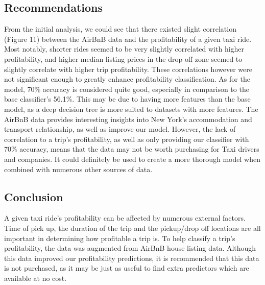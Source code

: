 \documentclass[11pt]{article}
\begin{document}
\subsection{Recommendations}
From the initial analysis, we could see that there existed slight correlation (Figure 11) between the AirBnB data and the profitability of a given taxi ride. Most notably, shorter rides seemed to be very slightly correlated with higher profitability, and higher median listing prices in the drop off zone seemed to slightly correlate with higher trip profitability. These correlations however were not significant enough to greatly enhance profitability classification. As for the model, 70\% accuracy is considered quite good, especially in comparison to the base classifier's 56.1\%. This may be due to having more features than the base model, as a deep decision tree is more suited to datasets with more features. The AirBnB data provides interesting insights into New York's accommodation and transport relationship, as well as improve our model. However, the lack of correlation to a trip's profitability, as well as only providing our classifier with 70\% accuracy, means that the data may not be worth purchasing for Taxi drivers and companies. It could definitely be used to create a more thorough model when combined with numerous other sources of data.

\subsection{Conclusion}
A given taxi ride's profitability can be affected by numerous external factors. Time of pick up, the duration of the trip and the pickup/drop off locations are all important in determining how profitable a trip is. To help classify a trip's profitability, the data was augmented from AirBnB house listing data. Although this data improved our profitability predictions, it is recommended that this data is not purchased, as it may be just as useful to find extra predictors which are available at no cost.


\clearpage
\end{document}
